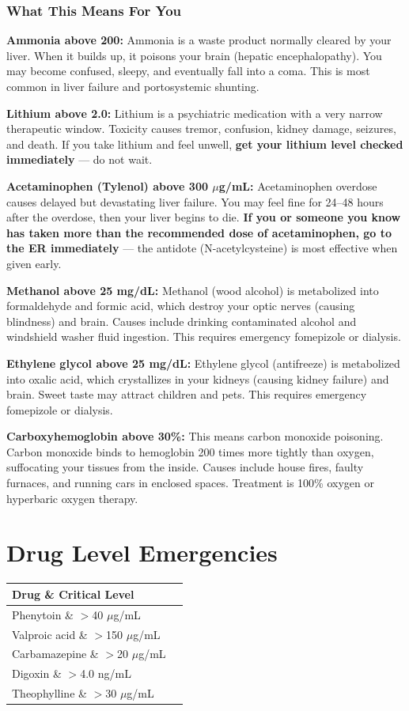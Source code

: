 \subsubsection{What This Means For You}

\textbf{Ammonia above 200:} Ammonia is a waste product normally cleared by your liver. When it builds up, it poisons your brain (hepatic encephalopathy). You may become confused, sleepy, and eventually fall into a coma. This is most common in liver failure and portosystemic shunting.

\textbf{Lithium above 2.0:} Lithium is a psychiatric medication with a very narrow therapeutic window. Toxicity causes tremor, confusion, kidney damage, seizures, and death. If you take lithium and feel unwell, \textbf{get your lithium level checked immediately} --- do not wait.

\textbf{Acetaminophen (Tylenol) above 300 $\mu$g/mL:} Acetaminophen overdose causes delayed but devastating liver failure. You may feel fine for 24--48 hours after the overdose, then your liver begins to die. \textbf{If you or someone you know has taken more than the recommended dose of acetaminophen, go to the ER immediately} --- the antidote (N-acetylcysteine) is most effective when given early.

\textbf{Methanol above 25 mg/dL:} Methanol (wood alcohol) is metabolized into formaldehyde and formic acid, which destroy your optic nerves (causing blindness) and brain. Causes include drinking contaminated alcohol and windshield washer fluid ingestion. This requires emergency fomepizole or dialysis.

\textbf{Ethylene glycol above 25 mg/dL:} Ethylene glycol (antifreeze) is metabolized into oxalic acid, which crystallizes in your kidneys (causing kidney failure) and brain. Sweet taste may attract children and pets. This requires emergency fomepizole or dialysis.

\textbf{Carboxyhemoglobin above 30\%:} This means carbon monoxide poisoning. Carbon monoxide binds to hemoglobin 200 times more tightly than oxygen, suffocating your tissues from the inside. Causes include house fires, faulty furnaces, and running cars in enclosed spaces. Treatment is 100\% oxygen or hyperbaric oxygen therapy.

\clearpage
\section{Drug Level Emergencies}

\begin{longtable}{@{}ll@{}}
\toprule
\textbf{Drug} \& \textbf{Critical Level} \\
\midrule
Phenytoin \& $>$40 $\mu$g/mL \\
Valproic acid \& $>$150 $\mu$g/mL \\
Carbamazepine \& $>$20 $\mu$g/mL \\
Digoxin \& $>$4.0 ng/mL \\
Theophylline \& $>$30 $\mu$g/mL \\
\bottomrule
\end{longtable}

